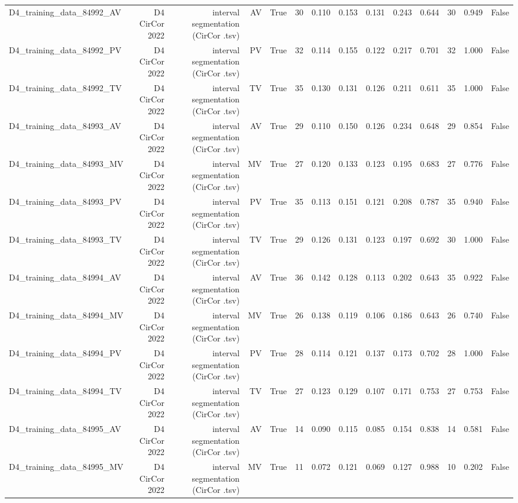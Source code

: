 \begin{table}[htbp]
\begin{tabular}{lrrrrrrrrrrrrr}
    D4\_training\_data\_84992\_AV & D4 CirCor 2022 & interval segmentation (CirCor .tsv) & AV & True & 30 & 0.110 & 0.153 & 0.131 & 0.243 & 0.644 & 30 & 0.949 & False \\
    D4\_training\_data\_84992\_PV & D4 CirCor 2022 & interval segmentation (CirCor .tsv) & PV & True & 32 & 0.114 & 0.155 & 0.122 & 0.217 & 0.701 & 32 & 1.000 & False \\
    D4\_training\_data\_84992\_TV & D4 CirCor 2022 & interval segmentation (CirCor .tsv) & TV & True & 35 & 0.130 & 0.131 & 0.126 & 0.211 & 0.611 & 35 & 1.000 & False \\
    D4\_training\_data\_84993\_AV & D4 CirCor 2022 & interval segmentation (CirCor .tsv) & AV & True & 29 & 0.110 & 0.150 & 0.126 & 0.234 & 0.648 & 29 & 0.854 & False \\
    D4\_training\_data\_84993\_MV & D4 CirCor 2022 & interval segmentation (CirCor .tsv) & MV & True & 27 & 0.120 & 0.133 & 0.123 & 0.195 & 0.683 & 27 & 0.776 & False \\
    D4\_training\_data\_84993\_PV & D4 CirCor 2022 & interval segmentation (CirCor .tsv) & PV & True & 35 & 0.113 & 0.151 & 0.121 & 0.208 & 0.787 & 35 & 0.940 & False \\
    D4\_training\_data\_84993\_TV & D4 CirCor 2022 & interval segmentation (CirCor .tsv) & TV & True & 29 & 0.126 & 0.131 & 0.123 & 0.197 & 0.692 & 30 & 1.000 & False \\
    D4\_training\_data\_84994\_AV & D4 CirCor 2022 & interval segmentation (CirCor .tsv) & AV & True & 36 & 0.142 & 0.128 & 0.113 & 0.202 & 0.643 & 35 & 0.922 & False \\
    D4\_training\_data\_84994\_MV & D4 CirCor 2022 & interval segmentation (CirCor .tsv) & MV & True & 26 & 0.138 & 0.119 & 0.106 & 0.186 & 0.643 & 26 & 0.740 & False \\
    D4\_training\_data\_84994\_PV & D4 CirCor 2022 & interval segmentation (CirCor .tsv) & PV & True & 28 & 0.114 & 0.121 & 0.137 & 0.173 & 0.702 & 28 & 1.000 & False \\
    D4\_training\_data\_84994\_TV & D4 CirCor 2022 & interval segmentation (CirCor .tsv) & TV & True & 27 & 0.123 & 0.129 & 0.107 & 0.171 & 0.753 & 27 & 0.753 & False \\
    D4\_training\_data\_84995\_AV & D4 CirCor 2022 & interval segmentation (CirCor .tsv) & AV & True & 14 & 0.090 & 0.115 & 0.085 & 0.154 & 0.838 & 14 & 0.581 & False \\
    D4\_training\_data\_84995\_MV & D4 CirCor 2022 & interval segmentation (CirCor .tsv) & MV & True & 11 & 0.072 & 0.121 & 0.069 & 0.127 & 0.988 & 10 & 0.202 & False \\

\end{tabular}
\end{table}
